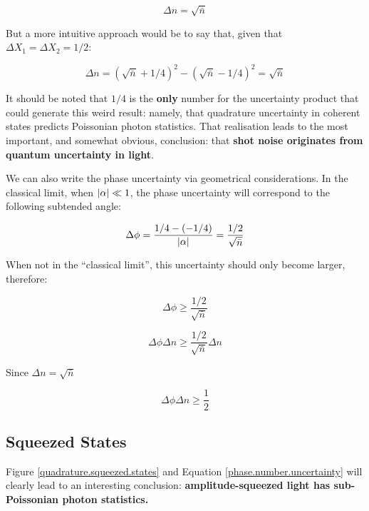 \documentclass[12pt,a4paper]{report}
\begin{document}
\begin{equation}
    \Delta n = \sqrt{\bar{n}}
\end{equation}

But a more intuitive approach would be to say that, given that $\Delta X_1=\Delta X_2=1/2$:

\begin{equation}
    \Delta n = (\sqrt{\bar{n}}+1/4)^2-(\sqrt{\bar{n}}-1/4)^2=\sqrt{\bar{n}}
\end{equation}

It should be noted that $1/4$ is the \textbf{only} number for the uncertainty product that could generate this weird result: namely, that quadrature uncertainty in coherent states predicts Poissonian photon statistics. That realisation leads to the most important, and somewhat obvious, conclusion: that \textbf{shot noise originates from quantum uncertainty in light}. 

We can also write the phase uncertainty via geometrical considerations. In the classical limit, when $\abs{\alpha}\ll1$, the phase uncertainty will correspond to the following subtended angle:

\begin{equation}
    \Delta \phi = \frac{1/4 - (-1/4)}{\abs{\alpha}}=\frac{1/2}{\sqrt{\bar{n}}}
\end{equation}

When not in the ``classical limit'', this uncertainty should only become larger, therefore:

\begin{equation}
    \Delta \phi \ge \frac{1/2}{\sqrt{\bar{n}}}
\end{equation}

\begin{equation}
    \Delta \phi \Delta n \ge \frac{1/2}{\sqrt{\bar{n}}}\Delta n
\end{equation}

Since $\Delta n = \sqrt{\bar{n}}$

\begin{equation}
    \boxed{\Delta \phi \Delta n \ge \frac{1}{2}}
    \label{phase.number.uncertainty}
\end{equation}

\subsection{Squeezed States}

Figure \ref{quadrature.squeezed.states} and Equation \ref{phase.number.uncertainty} will clearly lead to an interesting conclusion: \textbf{amplitude-squeezed light has sub-Poissonian photon statistics.}
\end{document}
